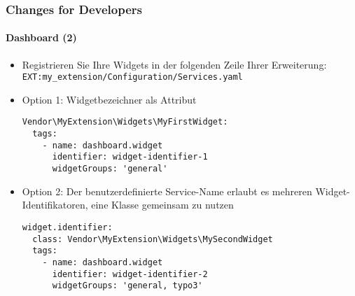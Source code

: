 
\begin{frame}[fragile]
	\frametitle{Changes for Developers}
	\framesubtitle{Dashboard (2)}

	\lstset{basicstyle=\tiny\ttfamily}

	\begin{itemize}
		\item Registrieren Sie Ihre Widgets in der folgenden Zeile Ihrer Erweiterung:\newline
			\texttt{EXT:my\_extension/Configuration/Services.yaml}

		\item Option 1: Widgetbezeichner als Attribut

\vspace{-0.4cm}
\begin{lstlisting}
Vendor\MyExtension\Widgets\MyFirstWidget:
  tags:
    - name: dashboard.widget
      identifier: widget-identifier-1
      widgetGroups: 'general'
\end{lstlisting}

		\item Option 2: Der benutzerdefinierte Service-Name erlaubt es mehreren Widget-Identifikatoren, eine Klasse gemeinsam zu nutzen

\vspace{-0.4cm}
\begin{lstlisting}
widget.identifier:
  class: Vendor\MyExtension\Widgets\MySecondWidget
  tags:
    - name: dashboard.widget
      identifier: widget-identifier-2
      widgetGroups: 'general, typo3'
\end{lstlisting}

	\end{itemize}

\end{frame}


